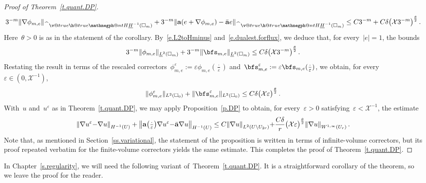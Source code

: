 \documentclass[11pt,twoside]{article} %
\makeatletter
\let\oldsquare\square %
\renewcommand{\square}{\oldsquare}
\numberwithin{equation}{section}
\theoremstyle{definition}
\let\originalleft\left
\let\originalright\right
\renewcommand{\left}{\mathopen{}\mathclose\bgroup\originalleft}
\renewcommand{\right}{\aftergroup\egroup\originalright}
\newcommand{\eps}{\varepsilon}
\renewcommand*{\hat}{\widehat}
\newcommand{\ep}{\eps}
\renewcommand{\a}{\mathbf{a}}
\newcommand{\ahom}{\bar{\a}}
\newcommand{\cu}{\square}
\newcommand{\X}{\mathcal{X}}
\newcommand{\negphantom}{\v@true\h@true\negph@nt}
\newcommand{\negph@nt}{\ifmmode\expandafter\mathpalette 
  \expandafter\mathnegph@nt\else\expandafter\makenegph@nt\fi}
\newcommand{\makenegph@nt}[1]{%
  \setbox\z@\hbox{\color@begingroup#1\color@endgroup}\finnegph@nt}
\newcommand{\finnegph@nt}{%
  \setbox\tw@\null 
  \ifv@ \ht\tw@\ht\z@\dp\tw@\dp\z@\fi \ifh@\wd\tw@-\wd\z@\fi\box\tw@}
\newcommand{\mathnegph@nt}[2]{%
  \setbox\z@\hbox{$\m@th #1{#2}$}\finnegph@nt}
\newcommand{\Hminusul}{\hat{\phantom{H}}\negphantom{H}\underline{H}^{-1}}
\makeatother
\begin{document}
\begin{proof}[{Proof of Theorem~\ref{t.quant.DP}}]
\begin{equation}
\label{e.FV.sublinearity}
3^{-m}\| \nabla \phi_{m,e} \|_{\Hminusul(\cu_m)} 
+
3^{-m} \| \a (e +\nabla \phi_{m,e}) - \ahom e \|_{\Hminusul(\cu_m)} 
\leq
C3^{-m}  
+ 
C \delta  \bigl( \X 3^{-m} \bigr)^{\frac{\theta}2}
\,.
\end{equation}
Here~$\theta>0$ is as in the statement of the corollary.
By~\eqref{e.L2toHminus} and~\eqref{e.dualest.forflux}, we deduce that, for every~$|e|=1$, the bounds
\begin{equation}
\label{e.fvc.bounds.symm}
3^{-m} \| \phi_{m,e} \|_{\underline{L}^2(\cu_m)} 
+
3^{-m} \| \bfs_{m,e} \|_{\underline{L}^2(\cu_m)} 
\leq
C \delta \bigl( \X 3^{-m} \bigr)^{\frac{\theta}2}
\,.
\end{equation}
Restating the result in terms of the rescaled correctors~$\phi_{m,e}^\ep:= \ep \phi_{m,e}(\tfrac \cdot \ep)$ and~$\bfs_{m,e}^\ep:= \ep \bfs_{m,e}(\tfrac \cdot \ep)$, we obtain, for every~$\ep \in (0,\X^{-1})$, 
\begin{equation*}
\| \phi_{m,e}^\ep \|_{{L}^2(\cu_0)} 
+
\| \bfs_{m,e}^\ep \|_{{L}^2(\cu_0)} 
\leq 
C \delta \bigl( \X \ep \bigr)^{\frac{\theta}2}
\,.
\end{equation*}
With~$u$ and~$u^\ep$ as in Theorem~\ref{t.quant.DP}, we may apply Proposition~\ref{p.DP} to obtain, for every~$\ep>0$ satisfying~$\ep < \X^{-1}$, the estimate
\begin{align*}
\left\| \nabla u^\ep {-} \nabla  u  \right\|_{H^{-1}(U)}  
+ \left\| \a\left(\tfrac\cdot\ep\right) \nabla u^\ep {-} \ahom \nabla  u  \right\|_{H^{-1}(U)}
\leq 
C \left\| \nabla u \right\|_{L^{2}(U \setminus U_{2r})} 
{+}
\frac{C\delta}{r}
\bigl( \X \ep \bigr)^{\frac{\theta}2}
\left\|  \nabla u \right\|_{W^{1,\infty}(U_r)}
\,.
\end{align*}
Note that, as mentioned in Section~\ref{ss.variational}, the statement of the proposition is written in terms of infinite-volume correctors, but its proof repeated verbatim for the finite-volume correctors yields the same estimate. This completes the proof of Theorem~\ref{t.quant.DP}. 
\end{proof}


In Chapter~\ref{s.regularity}, we will need the following variant of~Theorem~\ref{t.quant.DP}. It is a straightforward corollary of the theorem, so we leave the proof for the reader. 
\end{document}

